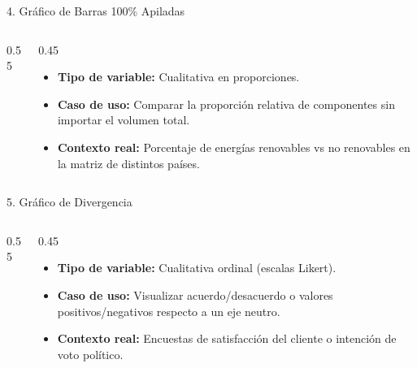 \documentclass[aspectratio=169,10pt]{beamer}
\begin{document}
\begin{frame}{4. Gráfico de Barras 100\% Apiladas}
\begin{columns}
\begin{column}{0.55\textwidth}
\end{column}
\begin{column}{0.45\textwidth}
\begin{itemize}\small
\item \textbf{Tipo de variable:} Cualitativa en proporciones.
\item \textbf{Caso de uso:} Comparar la proporción relativa de componentes sin importar el volumen total.
\item \textbf{Contexto real:} Porcentaje de energías renovables vs no renovables en la matriz de distintos países.
\end{itemize}
\end{column}
\end{columns}
\end{frame}

\begin{frame}{5. Gráfico de Divergencia}
\begin{columns}
\begin{column}{0.55\textwidth}
\end{column}
\begin{column}{0.45\textwidth}
\begin{itemize}\small
\item \textbf{Tipo de variable:} Cualitativa ordinal (escalas Likert).
\item \textbf{Caso de uso:} Visualizar acuerdo/desacuerdo o valores positivos/negativos respecto a un eje neutro.
\item \textbf{Contexto real:} Encuestas de satisfacción del cliente o intención de voto político.
\end{itemize}
\end{column}
\end{columns}
\end{frame}
\end{document}
